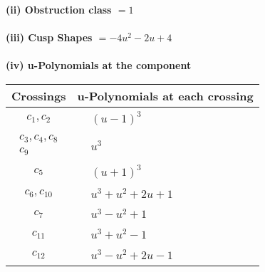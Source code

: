 \documentclass[1p]{elsarticle_modified}
\theoremstyle{definition}
\begin{document}
\flushleft \textbf{(ii) Obstruction class $= 1$}\\~\\
\flushleft \textbf{(iii) Cusp Shapes $= -4 u^2-2 u+4$}\\~\\
\newpage\renewcommand{\arraystretch}{1}
\flushleft \textbf{(iv) u-Polynomials at the component}\newline \\
\begin{tabular}{m{50pt}|m{274pt}}
Crossings & \hspace{64pt}u-Polynomials at each crossing \\
\hline $$\begin{aligned}c_{1},c_{2}\end{aligned}$$&$\begin{aligned}
&(u-1)^3
\end{aligned}$\\
\hline $$\begin{aligned}c_{3},c_{4},c_{8}\\c_{9}\end{aligned}$$&$\begin{aligned}
&u^3
\end{aligned}$\\
\hline $$\begin{aligned}c_{5}\end{aligned}$$&$\begin{aligned}
&(u+1)^3
\end{aligned}$\\
\hline $$\begin{aligned}c_{6},c_{10}\end{aligned}$$&$\begin{aligned}
&u^3+u^2+2 u+1
\end{aligned}$\\
\hline $$\begin{aligned}c_{7}\end{aligned}$$&$\begin{aligned}
&u^3- u^2+1
\end{aligned}$\\
\hline $$\begin{aligned}c_{11}\end{aligned}$$&$\begin{aligned}
&u^3+u^2-1
\end{aligned}$\\
\hline $$\begin{aligned}c_{12}\end{aligned}$$&$\begin{aligned}
&u^3- u^2+2 u-1
\end{aligned}$\\
\hline
\end{tabular}\\~\\
\end{document}
